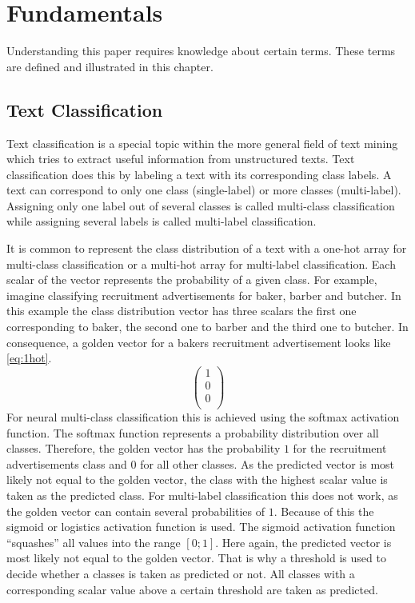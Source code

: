 \chapter{Fundamentals}
\label{ch:fundamentals}
	Understanding this paper requires knowledge about certain terms. These terms are defined and illustrated in this chapter.

	\section{Text Classification}
	\label{sec:classification}
		Text classification is a special topic within the more general field of text mining which tries to extract useful information from unstructured texts.\autocite{Baharudin.2010} Text classification does this by labeling a text with its corresponding class labels. A text can correspond to only one class (single-label) or more classes (multi-label). Assigning only one label out of several classes is called multi-class classification while assigning several labels is called multi-label classification.
		\par
		It is common to represent the class distribution of a text with a one-hot array for multi-class classification or a multi-hot array for multi-label classification. Each scalar of the vector represents the probability of a given class. For example, imagine classifying recruitment advertisements for baker, barber and butcher. In this example the class distribution vector has three scalars the first one corresponding to baker, the second one to barber and the third one to butcher. In consequence, a golden vector for a bakers recruitment advertisement looks like \eqref{eq:1hot}.
		\begin{equation}
			\label{eq:1hot}
			\begin{pmatrix}
				1\\
				0\\
				0\\
			\end{pmatrix}
		\end{equation}
		For neural multi-class classification this is achieved using the softmax activation function. The softmax function represents a probability distribution over all classes. Therefore, the golden vector has the probability $1$ for the recruitment advertisements class and $0$ for all other classes. As the predicted vector is most likely not equal to the golden vector, the class with the highest scalar value is taken as the predicted class.\autocite{Krause.2017}
		For multi-label classification this does not work, as the golden vector can contain several probabilities of $1$. Because of this the sigmoid or logistics activation function is used. The sigmoid activation function \enquote{squashes} all values into the range $[0;1]$. \autocite{Krause.2017} Here again, the predicted vector is most likely not equal to the golden vector. That is why a threshold is used to decide whether a classes is taken as predicted or not. All classes with a corresponding scalar value above a certain threshold are taken as predicted. \autocite{LeCun.2015}

